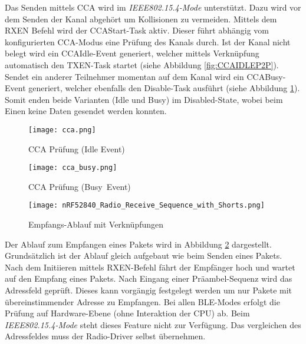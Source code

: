 Das Senden mittels CCA wird im \textit{IEEE802.15.4-Mode} unterstützt.
Dazu wird vor dem Senden der Kanal abgehört um Kollisionen zu vermeiden.
Mittels dem RXEN Befehl wird der CCAStart-Task aktiv. Dieser führt abhängig vom konfigurierten CCA-Modus eine Prüfung des Kanals durch.
Ist der Kanal nicht belegt wird ein CCAIdle-Event generiert, welcher mittels Verknüpfung automatisch den TXEN-Task startet (siehe Abbildung \ref{fig:CCAIDLEP2P}).
Sendet ein anderer Teilnehmer momentan auf dem Kanal wird ein CCABusy-Event generiert, welcher ebenfalls den Disable-Task ausführt (siehe Abbildung \ref{fig:CCABUSYP2P}).
Somit enden beide Varianten (Idle und Busy) im Disabled-State, wobei beim Einen keine Daten gesendet werden konnten. \cite{nordic_semi_nrf_infocenter_radio_transmit_sequence_2020}

\begin{figure}[!htbp]
\begin{adjustbox}{width=1\textwidth}
	\begin{minipage}[b]{0.5\textwidth}
		\centering
		\texttt{[image: cca.png]}
		\caption[Sende-Ablauf mit CCA Idle]{CCA Prüfung (Idle Event)\cite{nordic_semi_nrf_infocenter_radio_ieee_operation_2020}}
		\label{fig:CCAIDLEP2P}
	\end{minipage}
	\begin{minipage}[b]{0.5\textwidth}
		\centering
		\texttt{[image: cca\_busy.png]}
		\caption[Sende-Ablauf mit CCA Busy]{CCA Prüfung (Busy~Event)\cite{nordic_semi_nrf_infocenter_radio_ieee_operation_2020}}
		\label{fig:CCABUSYP2P}
	\end{minipage}
\end{adjustbox}
\end{figure}

\begin{figure} [H]
	\centering
	\texttt{[image: nRF52840\_Radio\_Receive\_Sequence\_with\_Shorts.png]}
	\caption{Empfangs-Ablauf mit Verknüpfungen \cite{nordic_semi_nrf_infocenter_radio_receive_sequence_2020}}
	\label{fig:RadioReceiveSequP2P}
\end{figure}


Der Ablauf zum Empfangen eines Pakets wird in Abbildung \ref{fig:RadioReceiveSequP2P} dargestellt. Grundsätzlich ist der Ablauf gleich aufgebaut wie beim Senden eines Pakets. Nach dem Initiieren mittels RXEN-Befehl fährt der Empfänger hoch und wartet auf den Empfang eines Pakets. Nach Eingang einer Präambel-Sequenz wird das Adressfeld geprüft.
Dieses kann vorgängig festgelegt werden um nur Pakete mit übereinstimmender Adresse zu Empfangen.
Bei allen BLE-Modes erfolgt die Prüfung auf Hardware-Ebene (ohne Interaktion der CPU) ab.
Beim \textit{IEEE802.15.4-Mode} steht dieses Feature nicht zur Verfügung. Das vergleichen des Adressfeldes muss der Radio-Driver selbst übernehmen.

